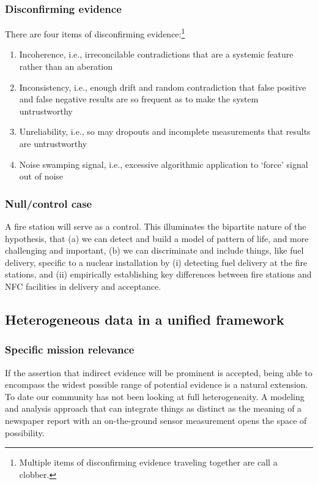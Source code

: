 \documentclass{article} %
\begin{document}
\subsubsection{Disconfirming evidence}
There are four items of disconfirming evidence:\footnote{Multiple  items of disconfirming evidence traveling together are call a clobber.}
\begin{enumerate}
\item Incoherence, i.e., irreconcilable contradictions that are a systemic feature rather than an aberation
\item Inconsistency, i.e., enough drift and random contradiction that false positive and false negative results are so frequent as to make the system untrustworthy
\item Unreliability, i.e., so may dropouts and incomplete measurements that results are untrustworthy
\item Noise swamping signal, i.e., excessive algorithmic application to `force' signal out of noise
\end{enumerate}

\subsubsection{Null/control case}
A fire station will serve as a control. This illuminates the bipartite nature of the hypothesis, that (a) we can detect and build a model of pattern of life, and more challenging and important, (b) we can discriminate and include things, like fuel delivery, specific to a nuclear installation by (i) detecting fuel delivery at the fire stations, and (ii) empirically establishing key differences between fire stations and NFC facilities in delivery and acceptance.

\pagebreak
\subsection{Heterogeneous data in a unified framework}
\subsubsection{Specific mission relevance}
If the assertion that indirect evidence will be prominent is accepted, being able to encompass the widest possible range of potential evidence is a natural extension. To date our community has not been looking at full heterogeneaity. A modeling and analysis approach that can integrate things as distinct as the meaning of a newspaper report with an on-the-ground sensor measurement opens the space of possibility.
\end{document}
